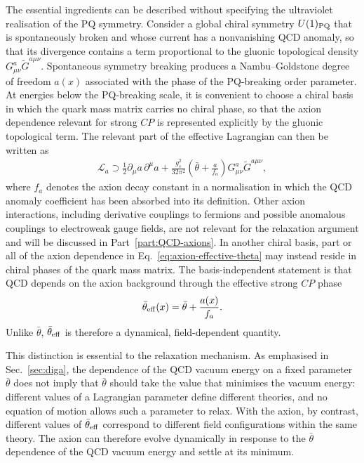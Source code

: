 \documentclass[review]{elsarticle}
\numberwithin{equation}{section}
\numberwithin{table}{section}
\numberwithin{figure}{section}
\begin{document}
The essential ingredients can be described without specifying the ultraviolet realisation of the PQ symmetry. Consider a global chiral symmetry $U(1)_{\rm PQ}$ that is spontaneously broken and whose current has a nonvanishing QCD anomaly, so that its divergence contains a term proportional to the gluonic topological density $G^a_{\mu\nu}\widetilde G^{a\mu\nu}$. Spontaneous symmetry breaking produces a Nambu--Goldstone degree of freedom $a(x)$ associated with the phase of the PQ-breaking order parameter. At energies below the PQ-breaking scale, it is convenient to choose a chiral basis in which the quark mass matrix carries no chiral phase, so that the axion dependence relevant for strong $CP$ is represented explicitly by the gluonic topological term. The relevant part of the effective Lagrangian can then be written as
\begin{align}
    \mathcal{L}_{a}
    \supset 
    \frac{1}{2}\partial_\mu a\,\partial^\mu a
    + \frac{g_s^2}{32\pi^2} \left(\bar\theta+\frac{a}{f_a}
    \right) G^a_{\mu\nu}\widetilde G^{a\mu\nu},
    \label{eq:axion-effective-theta}
\end{align}
where $f_a$ denotes the axion decay constant in a normalisation in which the QCD anomaly coefficient has been absorbed into its definition. Other axion interactions, including derivative couplings to fermions and possible anomalous couplings to electroweak gauge fields, are not relevant for the relaxation argument and will be discussed in Part~\ref{part:QCD-axions}. In another chiral basis, part or all of the axion dependence in Eq.~\eqref{eq:axion-effective-theta} may instead reside in chiral phases of the quark mass matrix. The basis-independent statement is that QCD depends on the axion background through the effective strong $CP$ phase
\begin{align}
    \bar\theta_{\rm eff}(x) = \bar\theta+\frac{a(x)}{f_a}.
    \label{eq:axion-effective-angle}
\end{align}
Unlike $\bar\theta$, $\bar\theta_{\rm eff}$ is therefore a dynamical, field-dependent quantity.

This distinction is essential to the relaxation mechanism. As emphasised in Sec.~\ref{sec:diga}, the dependence of the QCD vacuum energy on a fixed parameter $\bar\theta$ does not imply that $\bar\theta$ should take the value that minimises the vacuum energy: different values of a Lagrangian parameter define different theories, and no equation of motion allows such a parameter to relax. With the axion, by contrast, different values of $\bar\theta_{\rm eff}$ correspond to different field configurations within the same theory. The axion can therefore evolve dynamically in response to the $\bar\theta$ dependence of the QCD vacuum energy and settle at its minimum.
\end{document}
